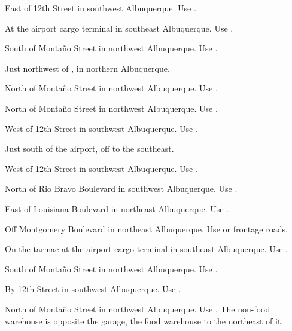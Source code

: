 

\begin{LocationList}

East of 12th Street in southwest Albuquerque. Use  .

At the airport cargo terminal in southeast Albuquerque. Use  .

South of Montaño Street in northwest Albuquerque. Use  .

Just northwest of  , in northern Albuquerque.

\Location{\GarageHQ \Garage}
North of Montaño Street in northwest Albuquerque. Use  .

North of Montaño Street in northwest Albuquerque. Use  .

West of 12th Street in southwest Albuquerque. Use  .

Just south of the airport, off   to the southeast.

West of 12th Street in southwest Albuquerque. Use  .

North of Rio Bravo Boulevard in southwest Albuquerque. Use  .

East of Louisiana Boulevard in northeast Albuquerque. Use  .

\Location{\TruckStop \Gas \Rest}
Off Montgomery Boulevard in northeast Albuquerque. Use   or frontage roads.

On the tarmac at the airport cargo terminal in southeast Albuquerque. Use  .

South of Montaño Street in northwest Albuquerque. Use  .

By 12th Street in southwest Albuquerque. Use  .

North of Montaño Street in northwest Albuquerque. Use  . The non-food warehouse is opposite the garage, the food warehouse to the northeast of it.

\end{LocationList}



